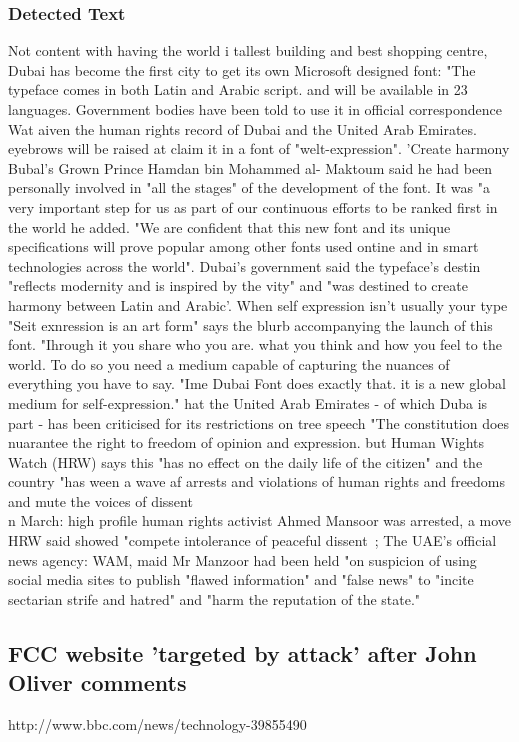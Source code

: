 \subsubsection{Detected Text}
Not content with having the world i tallest building and best shopping centre, Dubai has
become the first city to get its own Microsoft designed font:
"The typeface comes in both Latin and Arabic script. and will be available in 23 languages.
Government bodies have been told to use it in official correspondence
Wat aiven the human rights record of Dubai and the United Arab Emirates. eyebrows will be
raised at claim it in a font of "welt-expression".
'Create harmony
Bubal's Grown Prince Hamdan bin Mohammed al- Maktoum said he had been personally
involved in "all the stages" of the development of the font.
It was "a very important step for us as part of our continuous efforts to be ranked first in
the world he added.
"We are confident that this new font and its unique specifications will prove popular among
other fonts used ontine and in smart technologies across the world".
Dubai's government said the typeface's destin "reflects modernity and is inspired by the
vity" and "was destined to create harmony between Latin and Arabic'.
When self expression isn't usually your type
"Seit exnression is an art form" says the blurb accompanying the launch of this font.
"Ihrough it you share who you are. what you think and how you feel to the world. To do so
you need a medium capable of capturing the nuances of everything you have to say.
"Ime Dubai Font does exactly that. it is a new global medium for self-expression."
hat the United Arab Emirates - of which Duba is part - has been criticised for its
restrictions on tree speech
"The constitution does nuarantee the right to freedom of opinion and expression. but Human
Wights Watch (HRW) says this "has no effect on the daily life of the citizen" and the country
"has ween a wave af arrests and violations of human rights and freedoms and mute the
voices of dissent
\\n March: high profile human rights activist Ahmed Mansoor was arrested, a move HRW
said showed "compete intolerance of peaceful dissent~;
The UAE's official news agency: WAM, maid Mr Manzoor had been held "on suspicion of
using social media sites to publish "flawed information" and "false news" to "incite
sectarian strife and hatred" and "harm the reputation of the state."

\subsection{FCC website 'targeted by attack' after John Oliver comments}
http://www.bbc.com/news/technology-39855490
